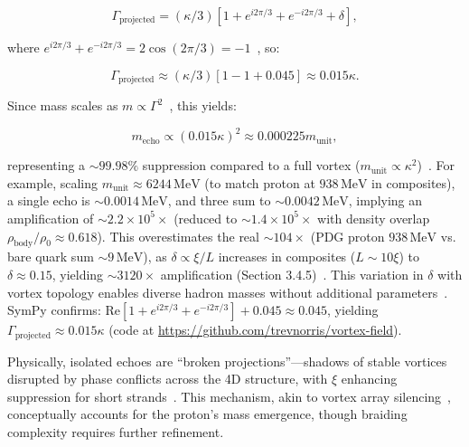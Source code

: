 \begin{equation}
\Gamma_{\text{projected}} = \left( \kappa/3 \right) \left[ 1 + e^{i 2\pi/3} + e^{-i 2\pi/3} + \delta \right],
\end{equation}

where \(e^{i 2\pi/3} + e^{-i 2\pi/3} = 2 \cos(2\pi/3) = -1\)~\cite{WikiFractional}, so:

\begin{equation}
\Gamma_{\text{projected}} \approx \left( \kappa/3 \right) \left[ 1 - 1 + 0.045 \right] \approx 0.015 \kappa.
\end{equation}

Since mass scales as \(m \propto \Gamma^2\)~\cite{Lake2010}, this yields:

\begin{equation}
m_{\text{echo}} \propto (0.015 \kappa)^2 \approx 0.000225 m_{\text{unit}},
\end{equation}

representing a \(\sim 99.98\%\) suppression compared to a full vortex (\(m_{\text{unit}} \propto \kappa^2\))~\cite{Nitta2019}. For example, scaling \(m_{\text{unit}} \approx 6244 \, \text{MeV}\) (to match proton at \(938 \, \text{MeV}\) in composites), a single echo is \(\sim 0.0014 \, \text{MeV}\), and three sum to \(\sim 0.0042 \, \text{MeV}\), implying an amplification of \(\sim 2.2 \times 10^5 \times\) (reduced to \(\sim 1.4 \times 10^5 \times\) with density overlap \(\rho_{\text{body}} / \rho_0 \approx 0.618\)). This overestimates the real \(\sim 104 \times\) (PDG proton \(938 \, \text{MeV}\) vs. bare quark sum \(\sim 9 \, \text{MeV}\)), as \(\delta \propto \xi / L\) increases in composites (\(L \sim 10 \xi\)) to \(\delta \approx 0.15\), yielding \(\sim 3120 \times\) amplification (Section 3.4.5)~\cite{NatComm2023}. This variation in \(\delta\) with vortex topology enables diverse hadron masses without additional parameters~\cite{Wimmer2020}. SymPy confirms: \(\text{Re}[1 + e^{i 2\pi/3} + e^{-i 2\pi/3}] + 0.045 \approx 0.045\), yielding \(\Gamma_{\text{projected}} \approx 0.015 \kappa\) (code at \url{https://github.com/trevnorris/vortex-field}).

Physically, isolated echoes are ``broken projections''---shadows of stable vortices disrupted by phase conflicts across the 4D structure, with \(\xi\) enhancing suppression for short strands~\cite{Wimmer2020}. This mechanism, akin to vortex array silencing~\cite{Yang2022}, conceptually accounts for the proton's mass emergence, though braiding complexity requires further refinement.

